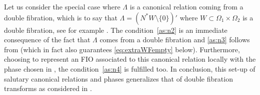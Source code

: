 \documentclass[
	fontsize=11pt, 
	twoside=false, 
	abstract=true, 
	a4paper,
]{scrartcl}
\newcommand{\sem}{\setminus\{0\}}
\begin{document}
\begin{remark}
	Let us consider the special case where $\Lambda$ is a canonical relation coming from a double fibration, which is to say that $\Lambda = (N^\ast W\sem)'$ where $W \subset \Omega_1\times\Omega_2$ is a double fibration, see for example \cite[Def.~1.5]{2306.05906v1}. The condition~\ref{as:n2} is an immediate consequence of the fact that $\Lambda$ comes from a double fibration and \ref{as:n3} follows from \cite[Lem.~5.3]{2306.05906v1} (which in fact also guarantees \cref{eq:extraWFempty} below). Furthermore, choosing to represent an FIO associated to this canonical relation locally with the phase chosen in \cite[\S~5.1]{2306.05906v1}, the condition~\ref{as:n4} is fulfilled too. In conclusion, this set-up of salutary canonical relations and phases generalizes that of double fibration transforms as considered in \cite{2306.05906v1}. 
\end{remark}
\end{document}
